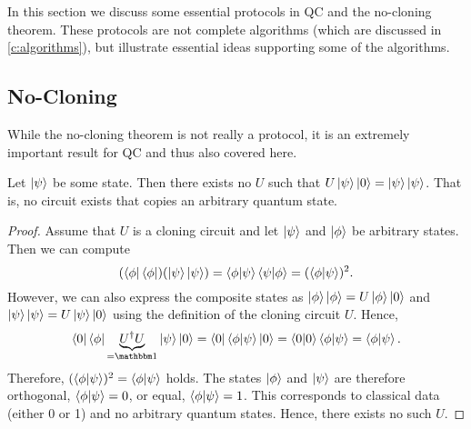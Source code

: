 		In this section we discuss some essential protocols in \ac{QC} and the no-cloning theorem. These protocols are not complete algorithms (which are discussed in \autoref{c:algorithms}), but illustrate essential ideas supporting some of the algorithms.

		\subsection{No-Cloning}
			While the no-cloning theorem is not really a protocol, it is an extremely important result for \ac{QC} and thus also covered here.

			\begin{theorem}[No-Cloning]
				Let \(\ket{\psi}\) be some state. Then there exists no \(U\) such that \( U \ket{\psi} \ket{0} = \ket{\psi}\ket{\psi} \). That is, no circuit exists that copies an arbitrary quantum state.
			\end{theorem}
			\begin{proof}
				Assume that \(U\) is a cloning circuit and let \(\ket{\psi}\) and \(\ket{\phi}\) be arbitrary states. Then we can compute
				\begin{equation}
					(\bra{\phi}\bra{\phi}) (\ket{\psi}\ket{\psi})
						= \ip{\phi}{\psi} \ip{\psi}{\phi}
						= (\ip{\phi}{\psi})^2.
				\end{equation}
				However, we can also express the composite states as \( \ket{\phi}\ket{\phi} = U \ket{\phi}\ket{0} \) and \( \ket{\psi}\ket{\psi} = U \ket{\psi}\ket{0} \) using the definition of the cloning circuit \(U\). Hence,
				\begin{equation}
					\bra{0}\bra{\phi} \underbrace{U^\dagger U}_{= \ID} \ket{\psi}\ket{0}
						= \bra{0}\bra{\phi} \ket{\psi}\ket{0}
						= \ip{0}{0} \ip{\phi}{\psi}
						= \ip{\phi}{\psi}.
				\end{equation}
				Therefore, \( (\ip{\phi}{\psi})^2 = \ip{\phi}{\psi} \) holds. The states \(\ket{\phi}\) and \(\ket{\psi}\) are therefore orthogonal, \( \ip{\phi}{\psi} = 0 \), or equal, \( \ip{\phi}{\psi} = 1 \). This corresponds to classical data (either \num{0} or \num{1}) and no arbitrary quantum states. Hence, there exists no such \(U\).
			\end{proof}

